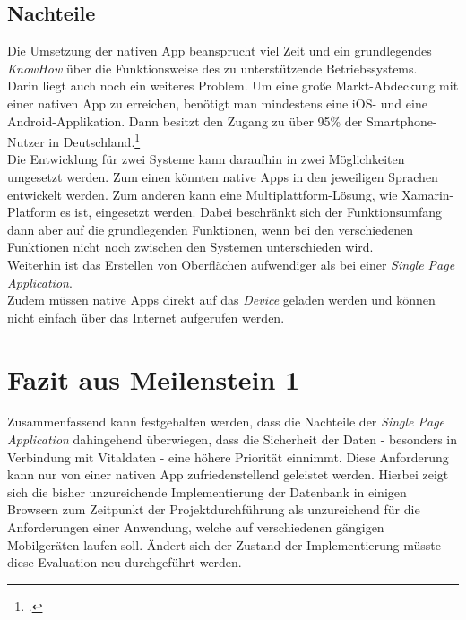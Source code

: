 \subsection{Nachteile}
\label{sec:nachteile-native-app}
Die Umsetzung der nativen App beansprucht viel Zeit und ein grundlegendes \textit{KnowHow} über die Funktionsweise des zu unterstützende Betriebssystems.\\
Darin liegt auch noch ein weiteres Problem. Um eine große Markt-Abdeckung mit einer nativen App zu erreichen, benötigt man mindestens eine iOS- und eine Android-Applikation. Dann besitzt den Zugang zu über 95\% der Smartphone-Nutzer in Deutschland.\footcite{Statista-SmartphoneVerteilung}\\
Die Entwicklung für zwei Systeme kann daraufhin in zwei Möglichkeiten umgesetzt werden. Zum einen könnten native Apps in den jeweiligen Sprachen entwickelt werden. Zum anderen kann eine Multiplattform-Lösung, wie Xamarin-Platform es ist, eingesetzt werden. Dabei beschränkt sich der Funktionsumfang dann aber auf die grundlegenden Funktionen, wenn bei den verschiedenen Funktionen nicht noch zwischen den Systemen unterschieden wird.\\
Weiterhin ist das Erstellen von Oberflächen aufwendiger als bei einer \textit{Single Page Application}.\\
Zudem müssen native Apps direkt auf das \textit{Device} geladen werden und können nicht einfach über das Internet aufgerufen werden.

\section{Fazit aus Meilenstein 1}
\label{sec:gegenueberstellung-fazit}
Zusammenfassend kann festgehalten werden, dass die Nachteile der \textit{Single Page Application} dahingehend überwiegen, dass die Sicherheit der Daten - besonders in Verbindung mit Vitaldaten - eine höhere Priorität einnimmt. Diese Anforderung kann nur von einer nativen App zufriedenstellend geleistet werden. Hierbei zeigt sich die bisher unzureichende Implementierung der Datenbank in einigen Browsern zum Zeitpunkt der Projektdurchführung als unzureichend für die Anforderungen einer Anwendung, welche auf verschiedenen gängigen Mobilgeräten laufen soll. Ändert sich der Zustand der Implementierung müsste diese Evaluation neu durchgeführt werden. 

